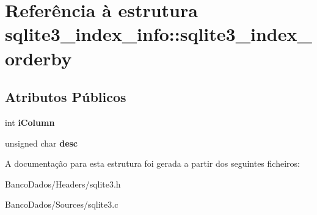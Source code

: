 \hypertarget{structsqlite3__index__info_1_1sqlite3__index__orderby}{\section{Referência à estrutura sqlite3\-\_\-index\-\_\-info\-:\-:sqlite3\-\_\-index\-\_\-orderby}
\label{structsqlite3__index__info_1_1sqlite3__index__orderby}
}
\subsection*{Atributos Públicos}
\begin{DoxyCompactItemize}
\item 
\hypertarget{structsqlite3__index__info_1_1sqlite3__index__orderby_a266396085bfda9acef3f13eaa170cd2f}{int {\bfseries i\-Column}}\label{structsqlite3__index__info_1_1sqlite3__index__orderby_a266396085bfda9acef3f13eaa170cd2f}

\item 
\hypertarget{structsqlite3__index__info_1_1sqlite3__index__orderby_a0586d1b5d36221af96aeba8cfc56e9c6}{unsigned char {\bfseries desc}}\label{structsqlite3__index__info_1_1sqlite3__index__orderby_a0586d1b5d36221af96aeba8cfc56e9c6}

\end{DoxyCompactItemize}


A documentação para esta estrutura foi gerada a partir dos seguintes ficheiros\-:\begin{DoxyCompactItemize}
\item 
Banco\-Dados/\-Headers/sqlite3.\-h\item 
Banco\-Dados/\-Sources/sqlite3.\-c\end{DoxyCompactItemize}
